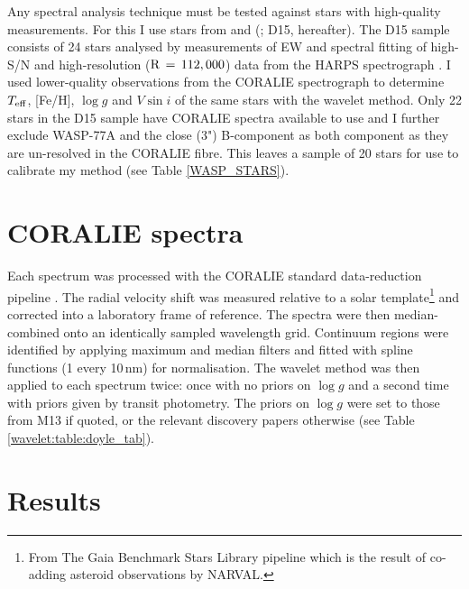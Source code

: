 Any spectral analysis technique must be tested against stars with high-quality measurements. For this  I use stars from  \citet{Doyle2013} and (\citealt{Doyle2015}; D15, hereafter). The D15 sample consists of 24 stars analysed by measurements of EW and spectral fitting of high-S/N and high-resolution ($\rm R\,=\,112,000$) data from the HARPS spectrograph \citep{2001Msngr.105....1Q}. I used lower-quality observations from the CORALIE spectrograph to determine $T_{\rm eff}$, [Fe/H], $\log g$ and $V \sin i$ of the same stars with the wavelet method. Only 22 stars in the D15 sample have CORALIE spectra available to use and I further exclude WASP-77A and the close (3") B-component as both component as they are un-resolved in the CORALIE fibre. This leaves a sample of 20 stars for use to calibrate my method (see Table \ref{WASP_STARS}).



\section{CORALIE spectra}\label{CORALIE_data}

Each spectrum was processed with the CORALIE standard data-reduction pipeline \citep{26AS..119..373B}. The radial velocity shift was measured relative to a solar template\footnote{From The Gaia Benchmark Stars Library pipeline which is the result of co-adding asteroid observations by NARVAL.} and corrected into a laboratory frame of reference. The spectra were then median-combined onto an identically sampled wavelength grid. Continuum regions were identified by applying maximum and median filters  \citep{Blanco-Cuaresma2017} and fitted with spline functions (1 every 10\,nm) for normalisation. The wavelet method was then applied to each spectrum twice: once with no priors on $\log g$ and a second time with priors given by transit photometry. The priors on $\log g$ were set to those from M13 if quoted, or the relevant discovery papers otherwise (see Table \ref{wavelet:table:doyle_tab}).  




\section{Results}\label{D15_results}

